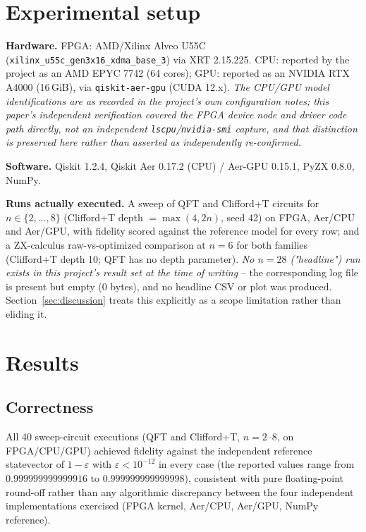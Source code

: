 \documentclass[pdflatex,sn-mathphys,Numbered]{sn-jnl}
\begin{document}
\section{Experimental setup}\label{sec:setup}

\textbf{Hardware.} FPGA: AMD/Xilinx Alveo U55C (\texttt{xilinx\_u55c\_gen3x16\_xdma\_base\_3}) via XRT 2.15.225. CPU: reported by the project as an AMD EPYC 7742 (64 cores); GPU: reported as an NVIDIA RTX A4000 (16\,GiB), via \texttt{qiskit-aer-gpu} (CUDA 12.x). \emph{The CPU/GPU model identifications are as recorded in the project's own configuration notes; this paper's independent verification covered the FPGA device node and driver code path directly, not an independent \texttt{lscpu}/\texttt{nvidia-smi} capture, and that distinction is preserved here rather than asserted as independently re-confirmed.}

\textbf{Software.} Qiskit 1.2.4, Qiskit Aer 0.17.2 (CPU) / Aer-GPU 0.15.1, PyZX 0.8.0, NumPy.

\textbf{Runs actually executed.} A sweep of QFT and Clifford+T circuits for $n\in\{2,\dots,8\}$ (Clifford+T depth $=\max(4,2n)$, seed 42) on FPGA, Aer/CPU and Aer/GPU, with fidelity scored against the reference model for every row; and a ZX-calculus raw-vs-optimized comparison at $n=6$ for both families (Clifford+T depth 10; QFT has no depth parameter). \emph{No $n=28$ ("headline") run exists in this project's result set at the time of writing} -- the corresponding log file is present but empty (0 bytes), and no headline CSV or plot was produced. Section~\ref{sec:discussion} treats this explicitly as a scope limitation rather than eliding it.

\section{Results}\label{sec:results}

\subsection{Correctness}\label{sec:results-correctness}

All 40 sweep-circuit executions (QFT and Clifford+T, $n=2$--8, on FPGA/CPU/GPU) achieved fidelity against the independent reference statevector of $1-\varepsilon$ with $\varepsilon<10^{-12}$ in every case (the reported values range from $0.999999999999916$ to $0.999999999999998$), consistent with pure floating-point round-off rather than any algorithmic discrepancy between the four independent implementations exercised (FPGA kernel, Aer/CPU, Aer/GPU, NumPy reference).
\end{document}
